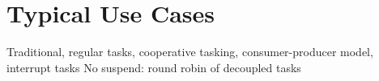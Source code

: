 \chapter{Typical Use Cases}

Traditional, regular tasks, cooperative tasking, consumer-producer model,
interrupt tasks
No suspend: round robin of decoupled tasks


